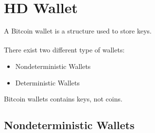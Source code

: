 
\chapter{HD Wallet} %

\label{bip32} %




A Bitcoin wallet is a structure used to store keys. \\ \\
There exist two different type of wallets:
\begin{itemize}
	\item Nondeterministic Wallets
	\item Deterministic Wallets
\end{itemize}
\begin{remark}
	Bitcoin wallets contains keys, not coins.
\end{remark}

\section{Nondeterministic Wallets}

